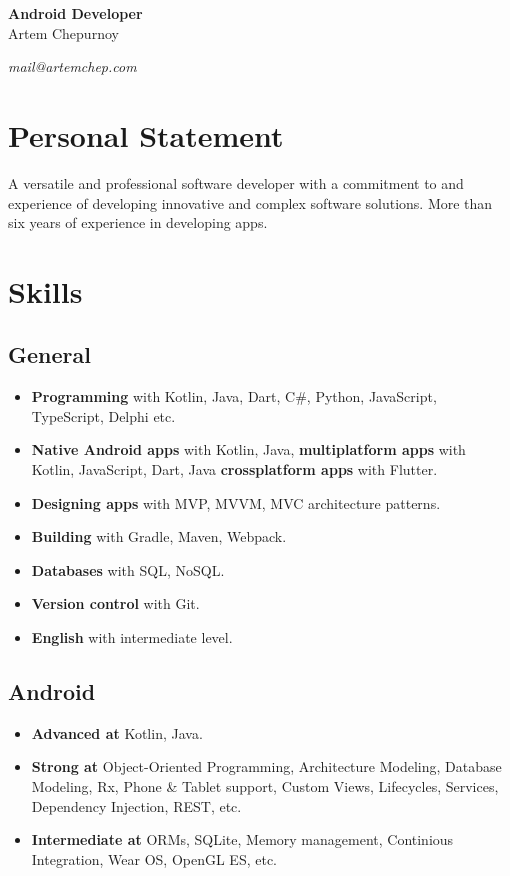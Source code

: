 \documentclass[a4paper]{article}
\begin{document}
	\begin{center}
		{\huge\bfseries Android Developer} \\[1em]
		{\Large Artem Chepurnoy} \\[1em]
		\faMapMarker \quad \myaddress
	\end{center}
	\vspace{1em}
	\textit{\faPaperPlane \quad mail@artemchep.com} \hspace*{\fill} \textit{\faPhone \quad \myphone} 

	\section*{Personal Statement}
	A versatile and professional software developer with a commitment to and experience of developing innovative and complex software solutions. 
	More than six years of experience in developing apps.

	\section*{Skills}
	\subsection*{General}
	\begin{multicols}{2}
	\begin{itemize}
		\item \textbf{Programming} with Kotlin, Java, Dart, C\#, Python, JavaScript, TypeScript, Delphi etc.
		\item \textbf{Native Android apps} with Kotlin, Java, \textbf{multiplatform apps} with Kotlin, JavaScript, Dart, Java \textbf{crossplatform apps} with Flutter.
		\item \textbf{Designing apps} with MVP, MVVM, MVC architecture patterns.
		\item \textbf{Building} with Gradle, Maven, Webpack.
		\item \textbf{Databases} with SQL, NoSQL.
		\item \textbf{Version control} with Git.
		\item \textbf{English} with intermediate level.
	\end{itemize}
	\end{multicols}
	\subsection*{Android}
	\begin{multicols}{2}
	\begin{itemize}
		\item \textbf{Advanced at} Kotlin, Java.
		\item \textbf{Strong at} Object-Oriented Programming, Architecture Modeling, Database Modeling, Rx, Phone \& Tablet support, Custom Views, Lifecycles, Services, Dependency Injection, REST, etc.
		\item \textbf{Intermediate at} ORMs, SQLite, Memory management, Continious Integration, Wear OS, OpenGL ES, etc.
	\end{itemize}
	\end{multicols}
\end{document}
